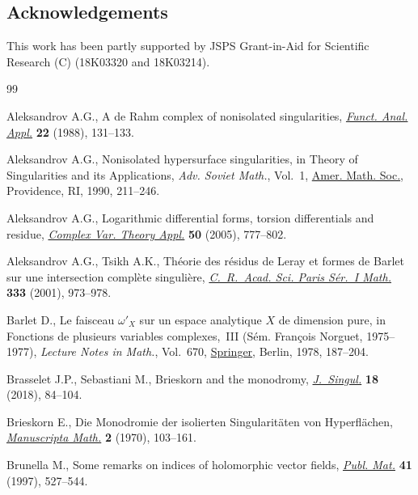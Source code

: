 \documentclass[10pt,a4paper]{amsart}
\numberwithin{equation}{section}
\begin{document}
\subsection*{Acknowledgements}
{\sloppy
This work has been partly supported by JSPS Grant-in-Aid for Scientific Research (C) (18K03320 and 18K03214).

}



\begin{thebibliography}{99}
\footnotesize\itemsep=0pt

Aleksandrov A.G., A de {R}ahm complex of nonisolated singularities,
 \href{https://doi.org/10.1007/BF01077604}{\textit{Funct. Anal. Appl.}} \textbf{22} (1988), 131--133.

Aleksandrov A.G., Nonisolated hypersurface singularities, in Theory of
 Singularities and its Applications, \textit{Adv. Soviet Math.}, Vol.~1, \href{https://doi.org/10.1070/sm1990v065n02abeh001164}{Amer.
 Math. Soc.}, Providence, RI, 1990, 211--246.

Aleksandrov A.G., Logarithmic differential forms, torsion differentials and
 residue, \href{https://doi.org/10.1080/02781070500128313}{\textit{Complex Var. Theory Appl.}} \textbf{50} (2005), 777--802.

Aleksandrov A.G., Tsikh A.K., Th\'eorie des r\'esidus de {L}eray et formes de
 {B}arlet sur une intersection compl\`ete singuli\`ere, \href{https://doi.org/10.1016/S0764-4442(01)02166-8}{\textit{C.~R.~Acad.
 Sci. Paris S\'er.~I Math.}} \textbf{333} (2001), 973--978.

Barlet D., Le faisceau {$\omega'_{X}$} sur un espace analytique {$X$} de
 dimension pure, in Fonctions de plusieurs variables complexes,~{III}
 ({S}\'em. {F}rançois {N}orguet, 1975--1977), \textit{Lecture Notes in
 Math.}, Vol.~670, \href{https://doi.org/10.1007/BFb0064400}{Springer}, Berlin, 1978, 187--204.

Brasselet J.P., Sebastiani M., Brieskorn and the monodromy, \href{https://doi.org/10.5427/jsing.2018.18f}{\textit{J.~Singul.}}
 \textbf{18} (2018), 84--104.

Brieskorn E., Die {M}onodromie der isolierten {S}ingularit\"aten von
 {H}yperfl\"achen, \href{https://doi.org/10.1007/BF01155695}{\textit{Manuscripta Math.}} \textbf{2} (1970), 103--161.

Brunella M., Some remarks on indices of holomorphic vector fields,
 \href{https://doi.org/10.5565/PUBLMAT_41297_17}{\textit{Publ. Mat.}} \textbf{41} (1997), 527--544.


\end{thebibliography}
\end{document}
